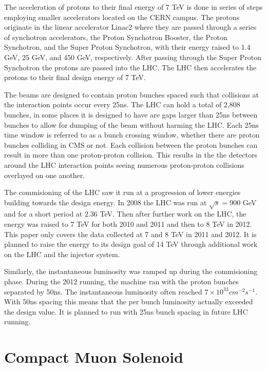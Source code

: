 The acceleration of protons to their final energy of 7 TeV is done in series of steps employing smaller accelerators located on the CERN campus. 
The protons originate in the linear accelerator Linac2 where they are passed through a series of synchotron accelerators, the Proton Synchotron Booster, the Proton Synchotron,
and the Super Proton Synchotron, with their energy raised to 1.4 GeV, 25 GeV, and 450 GeV, respectively. After passing through the Super Proton Synchotron the protons
are passed into the LHC. The LHC then accelerates the protons to their final design energy of 7 TeV.

The beams are designed to contain proton bunches spaced such that collisions at the interaction points occur every 25ns. 
The LHC can hold a total of 2,808 bunches, in some places it is designed to have are gaps larger than 25ns between bunches to allow for dumping of the beam without harming the LHC.
Each 25ns time window is referred to as a bunch crossing window, whether there are proton bunches colliding in CMS or not.
Each collision between the proton bunches can
result in more than one proton-proton collision. This results in the the detectors around the LHC interaction points seeing numerous proton-proton collisions
overlayed on one another.

The commisioning of the LHC saw it run at a progression of lower energies building towards the design energy. In 2008 the LHC was run at
$\sqrt{s}=900$ GeV and for a short period at 2.36 TeV. Then after further work on the LHC, the energy was raised to 7 TeV for both 2010 and 2011 and then to 8 TeV in 2012.
This paper only covers the data collected at 7 and 8 TeV in 2011 and 2012. It is planned to raise the energy to its design goal of 14 TeV through additional work on the
LHC and the injector system.

Similarly, the instantaneous luminosity was ramped up during the commisioning phase. During the 2012 running, the machine ran with the proton bunches separated by 50ns.
The instantaneous luminosity often reached $7\times10^{33}cm^{-2}s^{-1}$. With 50ns spacing this means that the per bunch luminosity actually exceeded
the design value. It is planned to run with 25ns bunch spacing in future LHC running.

\section{Compact Muon Solenoid}

